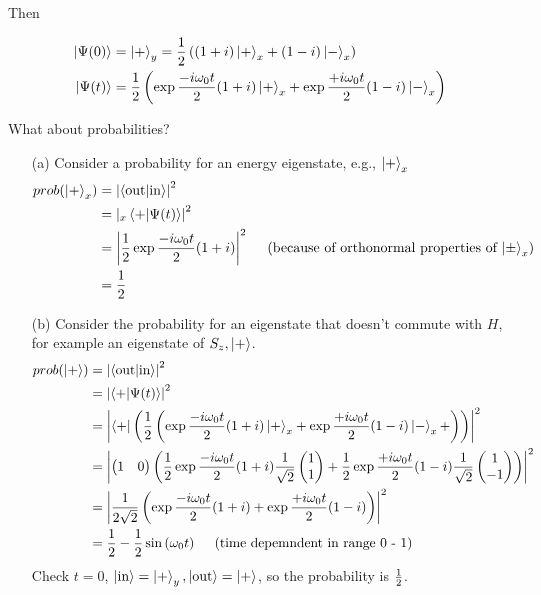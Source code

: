 \documentclass[english, 11pt]{article}
\begin{document}
\begin{itemize}
      Then

      \begin{align*}
          \left|\Psi(0)\right\rangle &  = \left|+\right\rangle_y = \frac{1}{2} \left( (1+i)\left|+\right\rangle_x + (1-i)\left|-\right\rangle_x \right) \\
          \left|\Psi(t)\right\rangle & = \frac{1}{2} \left( \exp{\frac{-i\omega_0t}{2}}(1+i)\left|+\right\rangle_x + \exp{\frac{+i\omega_0t}{2}}(1-i)\left|-\right\rangle_x \right)
      \end{align*}

      What about probabilities?

      \begin{itemize}
        \item[(a)] Consider a probability for an energy eigenstate, e.g., $\left|+\right\rangle_x$
        \begin{align*}
          prob(\kp_x) & = \left| \braket{\mbox{out}}{\mbox{in}} \right|^2 \\
                      & = \pr{{}_x\braket{+}{\Psi(t)}} \\
                      & = \pr{ \f{1}{2} \exp{\f{-i\omega_0t}{2}} (1+i) } \ \ \ \ \mbox{(because of orthonormal properties of $\ket{\pm}_x$)} \\
                      & = \f{1}{2}
        \end{align*}

        \item[(b)] Consider the probability for an eigenstate that doesn't commute with $H$, for example an eigenstate of $S_z, \left|+\right\rangle$.
        \begin{align*}
          prob(\kp) & = \left| \braket{\mbox{out}}{\mbox{in}} \right|^2 \\
                    & = \pr{\braket{+}{\Psi(t)}} \\
                    & = \pr{ \bra{+} \left( \f{1}{2} \left( \exp{\f{-i\omega_0t}{2}} (1+i)\kp_x + \exp{\f{+i\omega_0t}{2}} (1-i)\km_x +  \right) \right)  } \\
                    & = \pr{ \mtx{1 & 0} \left( \f{1}{2} \exp{\f{-i\omega_0t}{2}} (1+i) \f{1}{\sqrt{2}}\mtx{1\\1} + \f{1}{2}\exp{\f{+i\omega_0t}{2}}(1-i)\f{1}{\sqrt{2}}\mtx{1\\-1} \right) } \\
                    & = \pr{ \f{1}{2\sqrt{2}} \left( \exp{\f{-i\omega_0t}{2}}(1+i) + \exp{\f{+i\omega_0t}{2}} (1-i)\right) } \\
                    & = \f{1}{2} - \f{1}{2}\sin \left( \omega_0 t \right) \ \ \ \ \mbox{(time depemndent in range 0 - 1)}
        \end{align*}
        Check $t = 0$, $\left|\mbox{in}\right\rangle = \left|+\right\rangle_y, \left|\mbox{out}\right\rangle = \left|+\right\rangle$, so the probability is $\frac{1}{2}$.
      \end{itemize}
    \end{itemize}
\end{document}
